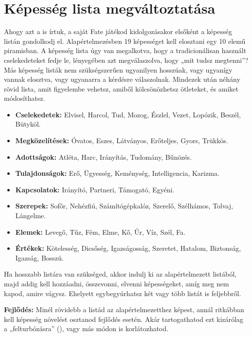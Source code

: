 \label{Képesség lista megváltoztatása}
\section{Képesség lista megváltoztatása}

Ahogy azt a  is írtuk, a saját Fate játékod kidolgozásakor elsőként a képesség listán gondolkodj el. Alapértelmezésben 19 képességet kell elosztani egy 10 elemű piramisban. A képesség lista úgy van megalkotva, hogy a tradicionálisan használt cselekedeteket fedje le, lényegében azt megválaszolva, hogy „mit tudsz megtenni”? Más képesség listák nem szükségszerűen ugyanilyen hosszúak, vagy ugyanígy vannak elosztva, vagy ugyanarra a kérdésre válaszolnak. Mindezek után néhány rövid lista, amit figyelembe vehetsz, amiből kölcsönözhetsz ötleteket, és amiket módosíthatsz.

\begin{itemize}
    \item \textbf{Cselekedetek:} Elvisel, Harcol, Tud, Mozog, Észlel, Vezet, Lopózik, Beszél, Bütyköl.
    \item \textbf{Megközelítések:} Óvatos, Eszes, Látványos, Erőteljes, Gyors, Trükkös.
    \item \textbf{Adottságok:} Atléta, Harc, Irányítás, Tudomány, Bűnözés.
    \item \textbf{Tulajdonságok:} Erő, Ügyesség, Keménység, Intelligencia, Karizma.
    \item \textbf{Kapcsolatok:} Irányító, Partneri, Támogató, Egyéni.
    \item \textbf{Szerepek:} Sofőr, Nehézfiú, Számítógépkalóz, Szerelő, Szélhámos, Tolvaj, Lángelme.
    \item \textbf{Elemek:} Levegő, Tűz, Fém, Elme, Kő, Űr, Víz, Szél, Fa.
    \item \textbf{Értékek:} Kötelesség, Dicsőség, Igazságosság, Szeretet, Hatalom, Biztonság, Igazság, Bosszú.
\end{itemize}

Ha hosszabb listára van szükséged, akkor indulj ki az alapértelmezett listából, majd addig kell hozzáadni, összevonni, elvenni képességeket, amíg meg nem kapod, amire vágysz. Ehelyett egybegyúrhatsz két vagy több listát is feljebbről.

\textbf{Fejlődés:} Minél rövidebb a listád az alapértelmezetthez képest, annál ritkábban kell képesség növelést osztanod fejlődés esetén. Akár tartogathatod ezt kizárólag a „felturbózásra” (), vagy más módon is korlátozhatod.

